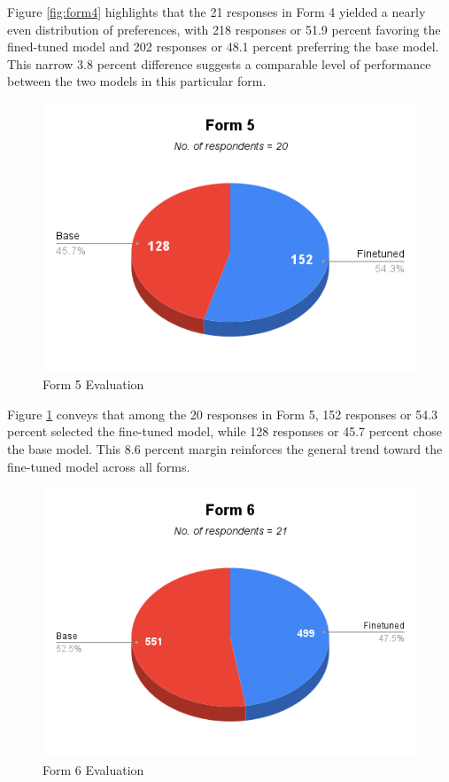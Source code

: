 Figure \ref{fig:form4} highlights that the 21 responses in Form 4 yielded a nearly even distribution of preferences, with 218 responses or 51.9 percent favoring the fined-tuned model and 202 responses or 48.1 percent preferring the base model. This narrow 3.8 percent difference suggests a comparable level of performance between the two models in this particular form. 

\begin{figure}[htbp]
	\centering
	\includegraphics[scale=0.7]{figures/Form5.png}
	\caption{Form 5 Evaluation}
	\label{fig:form5}	
\end{figure}

Figure \ref{fig:form5} conveys that among the 20 responses in Form 5, 152 responses or 54.3 percent selected the fine-tuned model, while 128 responses or 45.7 percent chose the base model. This 8.6 percent margin reinforces the general trend toward the fine-tuned model across all forms.

\begin{figure}[htbp]
	\centering
	\includegraphics[scale=0.7]{figures/Form 6.png}
	\caption{Form 6 Evaluation}
	\label{fig:form6}	
\end{figure}

